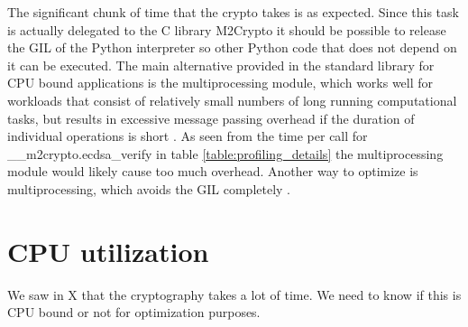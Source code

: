 The significant chunk of time that the crypto takes is as expected.
Since this task is actually delegated to the C library M2Crypto it should be possible to release the GIL of the Python interpreter so other Python code that does not depend on it can be executed.
The main alternative provided in the standard library for CPU bound applications is the multiprocessing module, which works well for workloads that consist of relatively small numbers of long running computational tasks, but results in excessive message passing overhead if the duration of individual operations is short \cite{http://python-notes.curiousefficiency.org/en/latest/python3/multicore_python.html}.
As seen from the time per call for \_\_m2crypto.ecdsa\_verify in table \ref{table:profiling_details} the multiprocessing module would likely cause too much overhead.
Another way to optimize is multiprocessing, which avoids the GIL completely \cite{quinten}.

\section{CPU utilization}
We saw in X that the cryptography takes a lot of time.
We need to know if this is CPU bound or not for optimization purposes.

